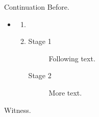 \documentclass[11pt]{beamer}
\begin{document}
\begin{frame}[t]{Continuation}
Before.\par
\begin{itemize}
\item<1-> \begin{enumerate}
\item<1-> 
\item<2-> \begin{description}
\item[Stage 1] Following text.
\item[Stage 2] More text.
\end{description}
\end{enumerate}
\end{itemize}
Witness.\par
\end{frame}
\end{document}
